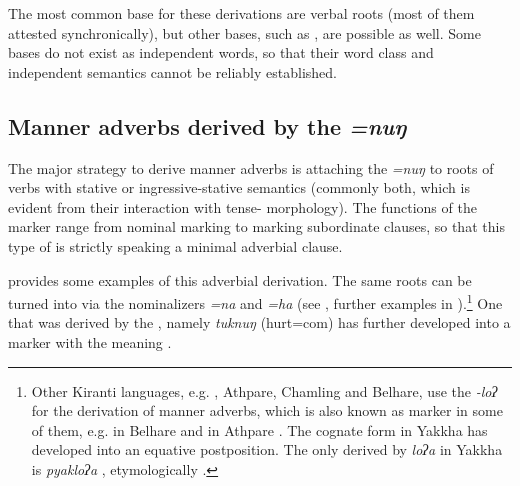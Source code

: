 The most common base for these derivations are verbal roots (most of them attested synchronically), but other bases, such  as , are possible as well. Some bases do not exist as independent words, so  that their word class and independent semantics cannot be reliably established. 

\subsection{Manner adverbs derived by the  \emph{=nuŋ}}
 
The major strategy to derive manner adverbs is attaching the    \emph{=nuŋ} to roots of verbs with stative or ingressive-stative semantics (commonly both, which is evident from their interaction with tense- morphology). The functions of the  marker range from nominal  marking to marking subordinate clauses, so that this type of  is strictly speaking a minimal adverbial clause.

 provides some examples of this adverbial derivation. The same roots can be turned  into  via the nominalizers \emph{=na} and \emph{=ha} (see \Next, further examples in ).\footnote{Other Kiranti languages, e.g. , Athpare, Chamling and Belhare, use the  \emph{-loʔ} for the derivation of manner adverbs, which is also known as   marker in some of them, e.g. in Belhare \citep[549]{Bickel2003Belhare} and in Athpare \citep[81]{Ebert1994The-structure}. The cognate form in Yakkha has developed into an equative postposition. The only  derived by \emph{loʔa} in Yakkha is \emph{pyakloʔa} , etymologically .}  One  that was derived by the , namely \emph{tuknuŋ} (hurt={\sc com}) has further developed into a  marker with the meaning . 
 
